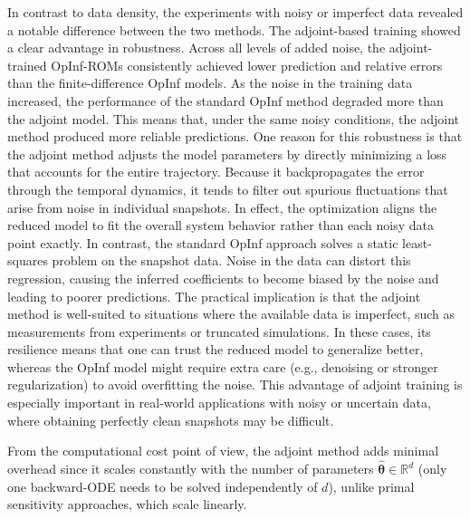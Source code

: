In contrast to data density, the experiments with noisy or imperfect data revealed a notable difference between the two methods. The adjoint-based training showed a clear advantage in robustness. Across all levels of added noise, the adjoint-trained OpInf-ROMs consistently achieved lower prediction and relative errors than the finite-difference OpInf models. As the noise in the training data increased, the performance of the standard OpInf method degraded more than the adjoint model. This means that, under the same noisy conditions, the adjoint method produced more reliable predictions. One reason for this robustness is that the adjoint method adjusts the model parameters by directly minimizing a loss that accounts for the entire trajectory. Because it backpropagates the error through the temporal dynamics, it tends to filter out spurious fluctuations that arise from noise in individual snapshots. In effect, the optimization aligns the reduced model to fit the overall system behavior rather than each noisy data point exactly. In contrast, the standard OpInf approach solves a static least-squares problem on the snapshot data. Noise in the data can distort this regression, causing the inferred coefficients to become biased by the noise and leading to poorer predictions. The practical implication is that the adjoint method is well-suited to situations where the available data is imperfect, such as measurements from experiments or truncated simulations. In these cases, its resilience means that one can trust the reduced model to generalize better, whereas the OpInf model might require extra care (e.g., denoising or stronger regularization) to avoid overfitting the noise. This advantage of adjoint training is especially important in real-world applications with noisy or uncertain data, where obtaining perfectly clean snapshots may be difficult.


From the computational cost point of view, the adjoint method adds minimal overhead since it scales constantly with the number of parameters $\hat{\bm{\theta}}\in\mathbb{R}^d$ (only one backward-ODE needs to be solved independently of $d$), unlike primal sensitivity approaches, which scale linearly.


